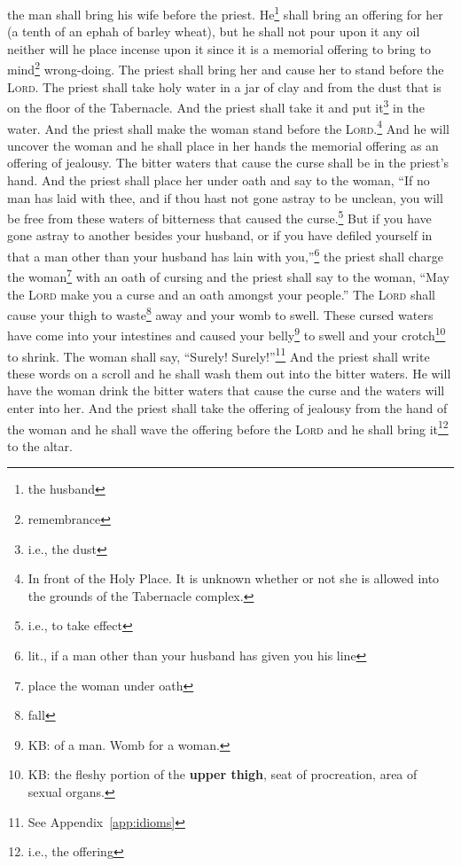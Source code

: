 \begin{inparaenum}
     the man shall bring his wife before the priest. He\footnote{the husband} shall bring an offering for her (a tenth of an ephah of barley wheat), but he shall not pour upon it any oil neither will he place incense upon it since it is a memorial offering to bring to mind\footnote{remembrance} wrong-doing.%
     The priest shall bring her and cause her to stand before the \textsc{Lord}.%
     The priest shall take holy water in a jar of clay and from the dust that is on the floor of the Tabernacle. And the priest shall take it and put it\footnote{i.e., the dust} in the water.%
     And the priest shall make the woman stand before the \textsc{Lord}.\footnote{In front of the Holy Place. It is unknown whether or not she is allowed into the grounds of the Tabernacle complex.} And he will uncover the woman and he shall place in her hands the memorial offering as an offering of jealousy. The bitter waters that cause the curse shall be in the priest's hand.%
     And the priest shall place her under oath and say to the woman, ``If no man has laid with thee, and if thou hast not gone astray to be unclean, you will be free from these waters of bitterness that caused the curse.\footnote{i.e., to take effect}%
     But if you have gone astray to another besides your husband, or if you have defiled yourself in that a man other than your husband has lain with you,''\footnote{lit., if a man other than your husband has given you his line}%
     the priest shall charge the woman\footnote{place the woman under oath} with an oath of cursing and the priest shall say to the woman, ``May the \textsc{Lord} make you a curse and an oath amongst your people.'' The \textsc{Lord} shall cause your thigh to waste\footnote{fall} away and your womb to swell.%
     These cursed waters have come into your intestines and caused your belly\footnote{KB: of a man. Womb for a woman.} to swell and your crotch\footnote{KB: the fleshy portion of the \textbf{upper thigh}, seat of procreation, area of sexual organs.} to shrink. The woman shall say, ``Surely! Surely!''\footnote{See Appendix~\ref{app:idioms}}%
     And the priest shall write these words on a scroll and he shall wash them out into the bitter waters.%
     He will have the woman drink the bitter waters that cause the curse and the waters will enter into her.%
     And the priest shall take the offering of jealousy from the hand of the woman and he shall wave the offering before the \textsc{Lord} and he shall bring it\footnote{i.e., the offering} to the altar.%

\end{inparaenum}
